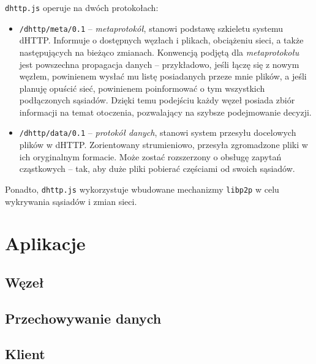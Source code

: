 \texttt{dhttp.js} operuje na dwóch protokołach:

\begin{itemize}
    \item \texttt{/dhttp/meta/0.1} -- {\em metaprotokół}, stanowi podstawę szkieletu systemu dHTTP. Informuje o dostępnych węzłach i plikach, obciążeniu sieci, a także następujących na bieżąco zmianach. Konwencją podjętą dla {\em metaprotokołu} jest powszechna propagacja danych -- przykładowo, jeśli łączę się z nowym węzłem, powinienem wysłać mu listę posiadanych przeze mnie plików, a jeśli planuję opuścić sieć, powinienem poinformować o tym wszystkich podłączonych sąsiadów. Dzięki temu podejściu każdy węzeł posiada zbiór informacji na temat otoczenia, pozwalający na szybsze podejmowanie decyzji.

    \item \texttt{/dhttp/data/0.1} -- {\em protokół danych}, stanowi system przesyłu docelowych plików w dHTTP. Zorientowany strumieniowo, przesyła zgromadzone pliki w ich oryginalnym formacie. Może zostać rozszerzony o obsługę zapytań cząstkowych -- tak, aby duże pliki pobierać częściami od swoich sąsiadów.
\end{itemize}
Ponadto, \texttt{dhttp.js} wykorzystuje wbudowane mechanizmy \texttt{libp2p} w celu wykrywania sąsiadów i zmian sieci.

\section{Aplikacje}

\subsection{Węzeł}

\subsection{Przechowywanie danych}
\label{sec:dataPropagation}

\subsection{Klient}



